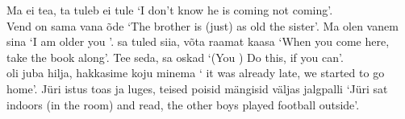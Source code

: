 Ma ei tea,  ta tuleb  ei tule `I don't know  he is coming  not coming'. \\

Vend on sama vana  õde `The brother is (just) as old  the sister'. Ma olen vanem  sina `I am older  you \sing'.  sa tuled siia, võta raamat kaasa `When you \sing come here, take the book along'. Tee seda,  sa oskad `(You \sing) Do this, if
you can'. \\

 oli juba hilja, hakkasime koju minema ` it was already late, we started to go home'. Jüri istus toas ja luges,  teised poisid mängisid väljas jalgpalli `Jüri sat indoors (in the room) and read,  the other boys played football outside'.


\newSection  \label{section-408}

